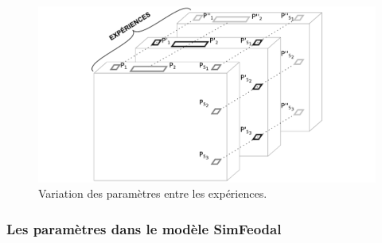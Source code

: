 \begin{figure}[H]
	\includegraphics[width=\linewidth]{img/schemas_params_4_experiences.pdf}
	\caption{Variation des paramètres entre les expériences.} 
	\label{fig:parametres-these-experiences} 
\end{figure}


\subsubsection{Les paramètres dans le modèle SimFeodal \label{sssec:types-parametres}}

